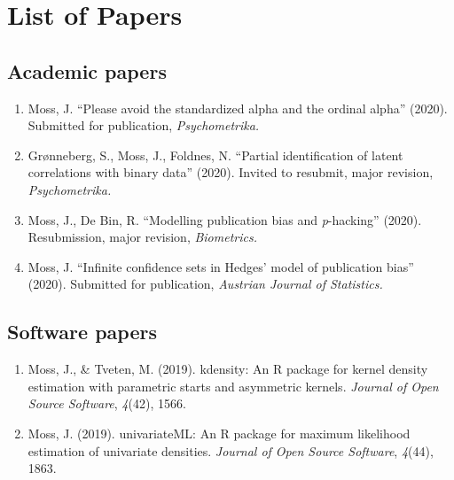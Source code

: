 \chapter{List of Papers}
\section*{Academic papers}
\begin{enumerate}

\item Moss, J. ``Please avoid the standardized alpha and the ordinal alpha''
(2020). Submitted for publication, \emph{Psychometrika.}

\item Grønneberg, S., Moss, J., Foldnes, N. ``Partial identification of
latent correlations with binary data'' (2020). Invited to resubmit, major revision, \emph{Psychometrika.}

\item Moss, J., De Bin, R. ``Modelling publication bias and \emph{p}-hacking''
(2020). Resubmission, major revision, \emph{Biometrics.}

\item Moss, J. ``Infinite confidence sets in Hedges' model of publication
bias'' (2020). Submitted for publication, \emph{Austrian Journal of Statistics.}

\end{enumerate}

\section*{Software papers}
\begin{enumerate}
\item Moss, J., \& Tveten, M. (2019). kdensity: An R package for kernel
density estimation with parametric starts and asymmetric kernels.
\emph{Journal of Open Source Software}, \emph{4}(42), 1566.
\item Moss, J. (2019). univariateML: An R package for maximum likelihood
estimation of univariate densities. \emph{Journal of Open Source Software},
\emph{4}(44), 1863.
\end{enumerate}
